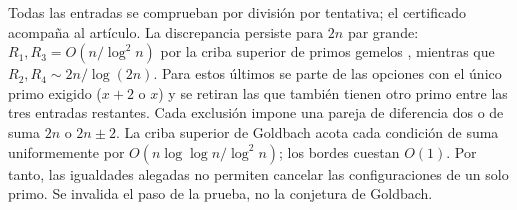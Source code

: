 \documentclass[11pt,a4paper]{article}
\newcommand{\B}[2]{#2}
\newcommand{\B}[2]{#1}
\begin{document}
\B{All entries can be checked by trial division; the certificate accompanies the article. In fact the mismatch persists for large even $2n$: $R_1,R_3=O(n/\log^2 n)$ by the upper sieve for twin primes \cite{wu}, while $R_2,R_4\sim 2n/\log(2n)$. For the latter, start from the choices with the required single prime ($x+2$ or $x$) and exclude cases in which one of the other three entries is also prime. Each exclusion is either a gap-two prime pair or a pair of sum $2n$ or $2n\pm2$. The upper Goldbach sieve bounds each sum constraint by $O(n\log\log n/\log^2 n)$ uniformly; boundary exclusions cost $O(1)$. The argument therefore cannot cancel the single-prime configurations by the claimed equalities. This rejects the proof step, not the Goldbach conjecture.}{Todas las entradas se comprueban por división por tentativa; el certificado acompaña al artículo. La discrepancia persiste para $2n$ par grande: $R_1,R_3=O(n/\log^2 n)$ por la criba superior de primos gemelos \cite{wu}, mientras que $R_2,R_4\sim 2n/\log(2n)$. Para estos últimos se parte de las opciones con el único primo exigido ($x+2$ o $x$) y se retiran las que también tienen otro primo entre las tres entradas restantes. Cada exclusión impone una pareja de diferencia dos o de suma $2n$ o $2n\pm2$. La criba superior de Goldbach acota cada condición de suma uniformemente por $O(n\log\log n/\log^2 n)$; los bordes cuestan $O(1)$. Por tanto, las igualdades alegadas no permiten cancelar las configuraciones de un solo primo. Se invalida el paso de la prueba, no la conjetura de Goldbach.}
\end{document}
